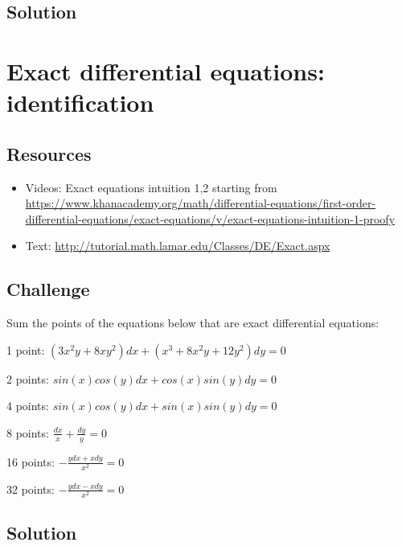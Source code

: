 \subsection*{Solution}
\six{}


\timebox



\newpage
\section{Exact differential equations: identification}
\label{sec:edeid}

\subsection*{Resources}
\begin{itemize}
    \item Videos: Exact equations intuition 1,2 starting from \url{https://www.khanacademy.org/math/differential-equations/first-order-differential-equations/exact-equations/v/exact-equations-intuition-1-proofy}
    \item Text: \url{http://tutorial.math.lamar.edu/Classes/DE/Exact.aspx}
\end{itemize}

\subsection*{Challenge}
Sum the points of the equations below that are exact differential equations:

1 point: $\displaystyle (3x^2y+8xy^2) dx + (x^3 + 8x^2y + 12 y^2) dy = 0$ %

2 points: $\displaystyle sin(x) cos(y) dx + cos(x) sin(y) dy = 0$ %

4 points: $\displaystyle sin(x) cos(y) dx + sin(x) sin(y) dy = 0$ %

8 points: $\displaystyle \frac{dx}{x} + \frac{dy}{y} = 0$ %

16 points: $\displaystyle -\frac{y dx + x dy}{x^2} = 0 $ %

32 points: $\displaystyle -\frac{y dx - x dy}{x^2} = 0$ %


\subsection*{Solution}
\six{}

